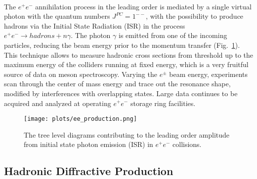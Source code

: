 ~\par The $e^{+}e^{-}$ annihilation process in the leading order is mediated by a single virtual photon with the quantum numbers $J^{PC} = 1^{--}$, with the possibility to produce hadrons via the Initial State Radiation (ISR) in the process $e^{+}e^{-} \rightarrow hadrons + n\gamma$. The photon $\gamma$ is emitted from one of the incoming particles, reducing the beam energy prior to the momentum transfer (Fig.~\ref{fig.1.3.1}). This technique allows to measure hadronic cross sections from threshold up to the maximum energy of the colliders running at fixed energy, which is a very fruitful source of data on meson spectroscopy. Varying the $e^{\pm}$ beam energy, experiments scan through the center of mass energy and trace out the resonance shape, modified by interferences with overlapping states. Large data continues to be acquired and analyzed at operating $e^{+}e^{-}$ storage ring facilities.

\begin{figure}[H]
    \centering
        \texttt{[image: plots/ee\_production.png]}
        \caption{The tree level diagrams contributing to the leading order amplitude from initial state photon emission (ISR) in $e^{+}e^{-}$ collisions.}
        \label{fig.1.3.1}
\end{figure}
 
 \subsection{Hadronic Diffractive Production}


